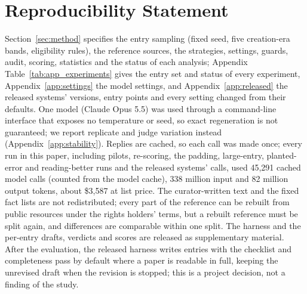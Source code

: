 \documentclass{article} %
\begin{document}
\section*{Reproducibility Statement}
Section~\ref{sec:method} specifies the entry sampling (fixed seed, five creation-era bands, eligibility rules), the reference sources, the strategies, settings, guards, audit, scoring, statistics and the status of each analysis; Appendix Table~\ref{tab:app_experiments} gives the entry set and status of every experiment, Appendix~\ref{app:settings} the model settings, and Appendix~\ref{app:released} the released systems' versions, entry points and every setting changed from their defaults. One model (Claude Opus 5.5) was used through a command-line interface that exposes no temperature or seed, so exact regeneration is not guaranteed; we report replicate and judge variation instead (Appendix~\ref{app:stability}). Replies are cached, so each call was made once; every run in this paper, including pilots, re-scoring, the padding, large-entry, planted-error and reading-better runs and the released systems' calls, used 45,291 cached model calls (counted from the model cache), 338 million input and 82 million output tokens, about \$3,587 at list price. The curator-written text and the fixed fact lists are not redistributed; every part of the reference can be rebuilt from public resources under the rights holders' terms, but a rebuilt reference must be split again, and differences are comparable within one split. The harness and the per-entry drafts, verdicts and scores are released as supplementary material. After the evaluation, the released harness writes entries with the checklist and completeness pass by default where a paper is readable in full, keeping the unrevised draft when the revision is stopped; this is a project decision, not a finding of the study.




\clearpage
\appendix
\setlength{\belowcaptionskip}{4pt}
\makeatletter
\setlength{\@fptop}{0pt}
\setlength{\@fpbot}{0pt plus 1fil}
\setlength{\@fpsep}{8pt plus 2pt minus 2pt}
\setlength{\abovecaptionskip}{4pt}
\setlength{\intextsep}{8pt plus 2pt minus 2pt}
\setlength{\floatsep}{8pt plus 2pt minus 2pt}
\setlength{\textfloatsep}{12pt plus 2pt minus 2pt}
\makeatother
\FloatBarrier
\end{document}
